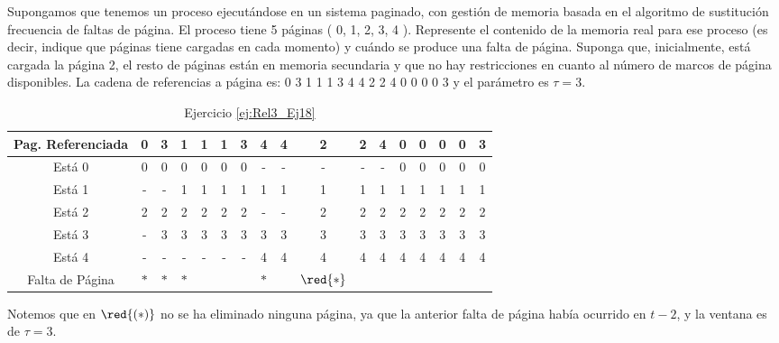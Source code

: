\begin{ejercicio} \label{ej:Rel3_Ej18}
    Supongamos que tenemos un proceso ejecutándose en un sistema paginado, con
gestión de memoria basada en el algoritmo de sustitución frecuencia de faltas de
página. El proceso tiene 5 páginas ( 0, 1, 2, 3, 4 ). Represente el contenido de la
memoria real para ese proceso (es decir, indique que páginas tiene cargadas en cada
momento) y cuándo se produce una falta de página. Suponga que, inicialmente, está
cargada la página 2, el resto de páginas están en memoria secundaria y que no hay
restricciones en cuanto al número de marcos de página disponibles. La cadena de
referencias a página es: 0 3 1 1 1 3 4 4 2 2 4 0 0 0 0 3 y el parámetro es $\tau=3$.

    \begin{table}[H]
        \centering
        \begin{tabular}{|c|c|c|c|c|c|c|c|c|c|c|c|c|c|c|c|c|}
            Pag. Referenciada & 0 & 3 & 1 & 1 & 1 & 3 & 4 & 4 & 2 & 2 & 4 & 0 & 0 & 0 & 0 & 3 \\ \hline \hline
            Está 0            & 0 & 0 & 0 & 0 & 0 & 0 & - & - & - & - & - & 0 & 0 & 0 & 0 & 0 \\ \hline
            Está 1            & - & - & 1 & 1 & 1 & 1 & 1 & 1 & 1 & 1 & 1 & 1 & 1 & 1 & 1 & 1 \\ \hline
            Está 2            & 2 & 2 & 2 & 2 & 2 & 2 & - & - & 2 & 2 & 2 & 2 & 2 & 2 & 2 & 2 \\ \hline
            Está 3            & - & 3 & 3 & 3 & 3 & 3 & 3 & 3 & 3 & 3 & 3 & 3 & 3 & 3 & 3 & 3 \\ \hline
            Está 4            & - & - & - & - & - & - & 4 & 4 & 4 & 4 & 4 & 4 & 4 & 4 & 4 & 4 \\ \hline \hline
            Falta de Página   & $\ast$ & $\ast$ & $\ast$ &   &   &   & $\ast$ &   & $\red{\ast}$ &   &   &    &   &   &   & 
        \end{tabular}
        \caption{Ejercicio \ref{ej:Rel3_Ej18}}
        \label{tab:Rel3_Ej18}
    \end{table}

    Notemos que en $\red{(\ast)}$ no se ha eliminado ninguna página, ya que la anterior falta de página había ocurrido en $t-2$,
    y la ventana es de $\tau=3$.
\end{ejercicio}



